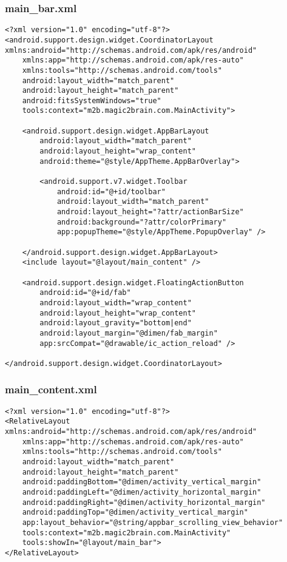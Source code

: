 \subsubsection{main\_bar.xml}
\begin{lstlisting}
<?xml version="1.0" encoding="utf-8"?>
<android.support.design.widget.CoordinatorLayout xmlns:android="http://schemas.android.com/apk/res/android"
    xmlns:app="http://schemas.android.com/apk/res-auto"
    xmlns:tools="http://schemas.android.com/tools"
    android:layout_width="match_parent"
    android:layout_height="match_parent"
    android:fitsSystemWindows="true"
    tools:context="m2b.magic2brain.com.MainActivity">

    <android.support.design.widget.AppBarLayout
        android:layout_width="match_parent"
        android:layout_height="wrap_content"
        android:theme="@style/AppTheme.AppBarOverlay">

        <android.support.v7.widget.Toolbar
            android:id="@+id/toolbar"
            android:layout_width="match_parent"
            android:layout_height="?attr/actionBarSize"
            android:background="?attr/colorPrimary"
            app:popupTheme="@style/AppTheme.PopupOverlay" />

    </android.support.design.widget.AppBarLayout>
    <include layout="@layout/main_content" />

    <android.support.design.widget.FloatingActionButton
        android:id="@+id/fab"
        android:layout_width="wrap_content"
        android:layout_height="wrap_content"
        android:layout_gravity="bottom|end"
        android:layout_margin="@dimen/fab_margin"
        app:srcCompat="@drawable/ic_action_reload" />

</android.support.design.widget.CoordinatorLayout>
\end{lstlisting}

\subsubsection{main\_content.xml}
\begin{lstlisting}
<?xml version="1.0" encoding="utf-8"?>
<RelativeLayout xmlns:android="http://schemas.android.com/apk/res/android"
    xmlns:app="http://schemas.android.com/apk/res-auto"
    xmlns:tools="http://schemas.android.com/tools"
    android:layout_width="match_parent"
    android:layout_height="match_parent"
    android:paddingBottom="@dimen/activity_vertical_margin"
    android:paddingLeft="@dimen/activity_horizontal_margin"
    android:paddingRight="@dimen/activity_horizontal_margin"
    android:paddingTop="@dimen/activity_vertical_margin"
    app:layout_behavior="@string/appbar_scrolling_view_behavior"
    tools:context="m2b.magic2brain.com.MainActivity"
    tools:showIn="@layout/main_bar">
</RelativeLayout>
\end{lstlisting}

